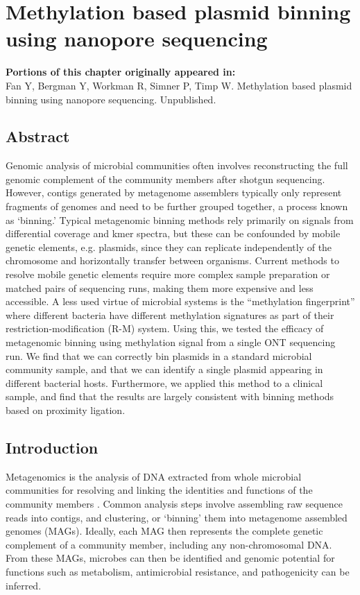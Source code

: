 \chapter{Methylation based plasmid binning using nanopore sequencing}
\label{chap:mdr}

\textbf{Portions of this chapter originally appeared in:} \\
Fan Y, Bergman Y, Workman R, Simner P, Timp W. Methylation based plasmid binning using nanopore sequencing. Unpublished.

\section{Abstract}
\label{sec:abstract}

Genomic analysis of microbial communities often involves reconstructing the full genomic complement of the community members after shotgun sequencing. However, contigs generated by metagenome assemblers typically only represent fragments of genomes and need to be further grouped together, a process known as ‘binning.’ Typical metagenomic binning methods rely primarily on signals from differential coverage and kmer spectra, but these can be confounded by mobile genetic elements, e.g. plasmids, since they can replicate independently of the chromosome and horizontally transfer between organisms. Current methods to resolve mobile genetic elements require more complex sample preparation or matched pairs of sequencing runs, making them more expensive and less accessible. A less used virtue of microbial systems is the “methylation fingerprint” where different bacteria have different methylation signatures as part of their restriction-modification (R-M) system. Using this, we tested the efficacy of metagenomic binning using methylation signal from a single ONT sequencing run. We find that we can correctly bin plasmids in a standard microbial community sample, and that we can identify a single plasmid appearing in different bacterial hosts. Furthermore, we applied this method to a clinical sample, and find that the results are largely consistent with binning methods based on proximity ligation.

\section{Introduction}
\label{sec:intro}

Metagenomics is the analysis of DNA extracted from whole microbial communities for resolving and linking the identities and functions of the community members \citep{Strous2012-nm}. Common analysis steps involve assembling raw sequence reads into contigs, and clustering, or ‘binning’ them into metagenome assembled genomes (MAGs). Ideally, each MAG then represents the complete genetic complement of a community member, including any non-chromosomal DNA. From these MAGs, microbes can then be identified and genomic potential for functions such as metabolism, antimicrobial resistance, and pathogenicity can be inferred.

